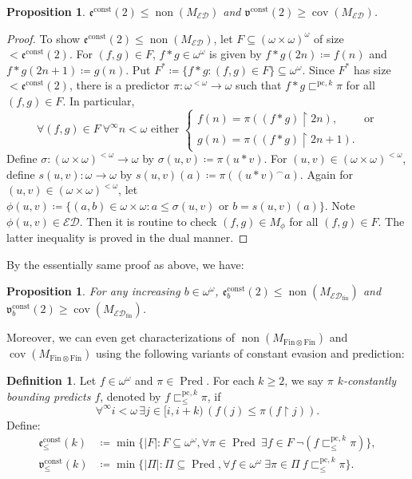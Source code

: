 \documentclass[a4paper,12pt]{amsart}
\newtheorem{prop}[thm]{Proposition}
\theoremstyle{definition}
\newtheorem{dfn}[thm]{Definition}
\numberwithin{thm}{section}
\numberwithin{equation}{section}
\newcommand{\oo}{{\omega}^\omega}
\newcommand{\fsq}{\omega^{<\omega}}
\newcommand{\on}{\mathpunct{\upharpoonright}}
\newcommand{\ee}{\mathfrak{e}}
\DeclareMathOperator{\non}{non}
\DeclareMathOperator{\cov}{cov}
\newcommand{\ed}{\mathcal{ED}}
\DeclareMathOperator{\Pred}{Pred}
\newcommand{\edfin}{\mathcal{ED}_\mathrm{fin}}
\newcommand{\finfin}{\mathrm{Fin}\otimes\mathrm{Fin}}
\newcommand{\eect}{\ee^{\mathrm{const}}(2)}
\newcommand{\vv}{\mathfrak{v}}
\newcommand{\vvct}{\vv^{\mathrm{const}}(2)}
\newcommand{\pck}{\sqsubset^{\mathrm{pc},k}}
\begin{document}
    \begin{prop}\label{prop:eect_nonMed}
    	$\eect\leq\non(M_{\ed})$ and $\vvct\geq\cov(M_{\ed})$.
    \end{prop}
    \begin{proof}
    	To show $\eect\leq\non(M_{\ed})$, let $F\subseteq(\omega\times\omega)^\omega$ of size $<\eect$. For $(f,g)\in F$, $f*g\in\oo$ is given by $f*g(2n)\coloneqq f(n)$ and $f*g(2n+1)\coloneqq g(n)$. Put $F^*\coloneqq\{f*g:(f,g)\in F\}\subseteq\oo$. Since $F^*$ has size $<\eect$, there is a predictor $\pi\colon\fsq\to\omega$ such that $f*g\pck\pi$ for all $(f,g)\in F$. In particular,
    	\begin{equation*}
    		\forall (f,g)\in F~\forall^\infty n<\omega\text{ either }
    		\begin{cases}
    			f(n)=\pi((f*g)\on 2n), & \text{or} \\
    			g(n)=\pi((f*g)\on 2n+1).         &
    		\end{cases}
    	\end{equation*}
    	Define $\sigma\colon(\omega\times\omega)^{<\omega}\to\omega$ by $\sigma(u,v)\coloneqq\pi(u*v)$. For $(u,v)\in (\omega\times\omega)^{<\omega}$, define $s(u,v)\colon\omega\to\omega$ by $s(u,v)(a)\coloneqq\pi((u*v)^\frown a)$. Again for $(u,v)\in (\omega\times\omega)^{<\omega}$, let $\phi(u,v)\coloneqq\{(a,b)\in\omega\times\omega:a\leq\sigma(u,v)\text{ or }b=s(u,v)(a)\}$. Note $\phi(u,v)\in\ed$. Then it is routine to check $(f,g)\in M_\phi$ for all $(f,g)\in F$. The latter inequality is proved in the dual manner.
    \end{proof}

    By the essentially same proof as above, we have:

    \begin{prop}\label{prop:edfin_const}
        For any increasing $b\in\omega^\omega$, $\ee^{\mathrm{const}}_b(2)\leq\non(M_{\edfin})$ and $\vv^{\mathrm{const}}_b(2)\geq\cov(M_{\edfin})$.
    \end{prop}

    Moreover, we can even get characterizations of $\non(M_{\finfin})$ and $\cov(M_{\finfin})$ using the following variants of constant evasion and prediction:
    
    \begin{dfn}
        Let $f\in\omega^\omega$ and $\pi\in\Pred$. For each $k\geq 2$, we say \emph{$\pi$ $k$-constantly bounding predicts $f$}, denoted by $f\sqsubset^{\mathrm{pc}, k}_{\leq}\pi$, if
        \[
        \forall^\infty i<\omega\,\exists j\in[i, i+k)\,(f(j)\leq\pi(f\upharpoonright j)).
        \]
        Define:
        \begin{align*}
			\ee^\mathrm{const}_{\leq}(k) &\coloneqq\min\{|F|:F\subseteq\oo,\forall \pi\in \Pred~\exists f\in F~ \lnot(f\sqsubset^{\mathrm{pc}, k}_{\leq}\pi)\},\\
			\vv^\mathrm{const}_{\leq}(k) &\coloneqq\min\{|\Pi|:\Pi\subseteq \Pred,\forall f\in\oo~\exists\pi\in \Pi~ f \sqsubset^{\mathrm{pc}, k}_{\leq} \pi\}.\\
		\end{align*}
    \end{dfn}
\end{document}

